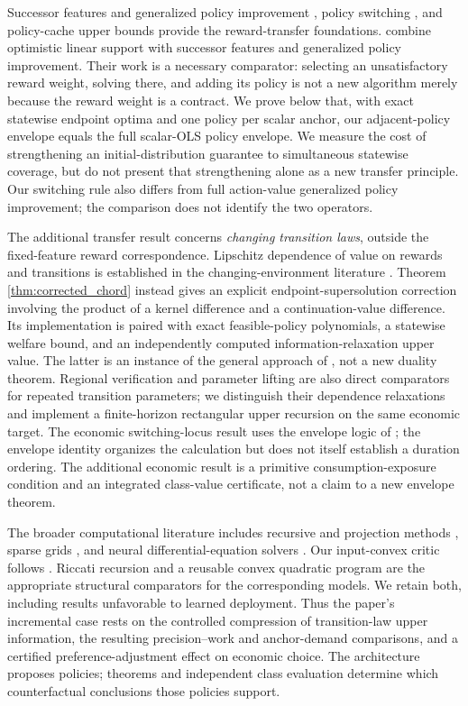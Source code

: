 Successor features and generalized policy improvement \citep{barreto2017}, policy switching \citep{chang2021}, and policy-cache upper bounds \citep{nemecek2021} provide the reward-transfer foundations. \citet{alegre2022} combine optimistic linear support with successor features and generalized policy improvement. Their work is a necessary comparator: selecting an unsatisfactory reward weight, solving there, and adding its policy is not a new algorithm merely because the reward weight is a contract. We prove below that, with exact statewise endpoint optima and one policy per scalar anchor, our adjacent-policy envelope equals the full scalar-OLS policy envelope. We measure the cost of strengthening an initial-distribution guarantee to simultaneous statewise coverage, but do not present that strengthening alone as a new transfer principle. Our switching rule also differs from full action-value generalized policy improvement; the comparison does not identify the two operators.

The additional transfer result concerns \emph{changing transition laws}, outside the fixed-feature reward correspondence. Lipschitz dependence of value on rewards and transitions is established in the changing-environment literature \citep{csaji2008}. Theorem \ref{thm:corrected_chord} instead gives an explicit endpoint-supersolution correction involving the product of a kernel difference and a continuation-value difference. Its implementation is paired with exact feasible-policy polynomials, a statewise welfare bound, and an independently computed information-relaxation upper value. The latter is an instance of the general approach of \citet{brown2010}, not a new duality theorem. Regional verification and parameter lifting \citep{quatmann2016} are also direct comparators for repeated transition parameters; we distinguish their dependence relaxations and implement a finite-horizon rectangular upper recursion on the same economic target. The economic switching-locus result uses the envelope logic of \citet{milgrom2002}; the envelope identity organizes the calculation but does not itself establish a duration ordering. The additional economic result is a primitive consumption-exposure condition and an integrated class-value certificate, not a claim to a new envelope theorem.

The broader computational literature includes recursive and projection methods \citep{stokey1989,judd1998}, sparse grids \citep{brumm2017}, and neural differential-equation solvers \citep{raissi2019,han2018}. Our input-convex critic follows \citet{amos2017}. Riccati recursion and a reusable convex quadratic program are the appropriate structural comparators for the corresponding models. We retain both, including results unfavorable to learned deployment. Thus the paper's incremental case rests on the controlled compression of transition-law upper information, the resulting precision--work and anchor-demand comparisons, and a certified preference-adjustment effect on economic choice. The architecture proposes policies; theorems and independent class evaluation determine which counterfactual conclusions those policies support.
